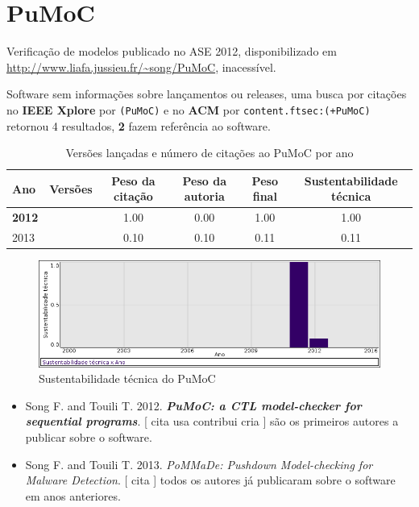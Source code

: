 \section{PuMoC}

Verificação de modelos
publicado no ASE 2012,
disponibilizado em \url{http://www.liafa.jussieu.fr/~song/PuMoC},
inacessível.

Software sem informações sobre lançamentos ou releases,
uma busca por citações no {\bf IEEE Xplore} por
\texttt{(PuMoC)}
e no {\bf ACM} por
\texttt{content.ftsec:(+PuMoC)}
retornou
4 resultados,
{\bf 2} fazem referência ao software.


\begin{table}[H]
\caption{Versões lançadas e número de citações ao PuMoC por ano}
\centering
\begin{tabular}{| l | c | c | c | c | c |}
  \hline
  Ano & Versões & Peso da citação & Peso da autoria & Peso final & Sustentabilidade técnica \\
  \hline
            {\bf 2012}
          &
          
          &
          1.00
          &
          0.00
          &
          1.00
          &
            {\color{blue} 1.00}
          \\
\hline
            2013
          &
          
          &
          0.10
          &
          0.10
          &
          0.11
          &
            {\color{red} 0.11}
          \\
\hline
\end{tabular}
\end{table}

\begin{figure}[h]
  \center
  \includegraphics[scale=0.50]{result-documents/charts/pumoc.png}
  \caption{Sustentabilidade técnica do PuMoC}
\end{figure}


\begin{itemize}
\item Song F. and Touili T.
      2012.
        \textbf{\textit{ PuMoC: a CTL model-checker for sequential programs}}.
      [
          cita
          usa
          contribui
          cria
      ]
são os primeiros autores a publicar sobre o software.
\item Song F. and Touili T.
      2013.
        \textit{ PoMMaDe: Pushdown Model-checking for Malware Detection}.
      [
          cita
      ]
todos os autores já publicaram sobre o software em anos anteriores.
\end{itemize}
